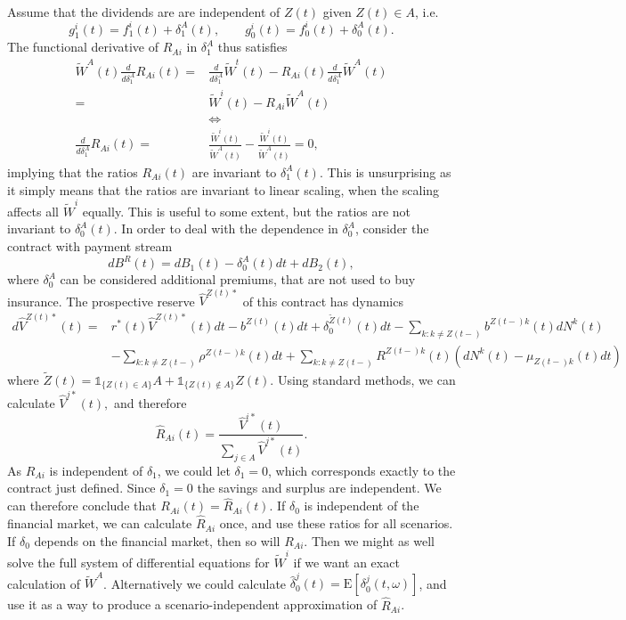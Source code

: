 \documentclass[12pt]{article}
\newcommand{\E}{\text{E}}
\newcommand{\indic}[1]{\mathds{1}_{ \{ #1 \} }}
\theoremstyle{my_thm}
\begin{document}
\\[12pt]
Assume that the dividends are are independent of $Z(t)$ given $Z(t)\in A$, i.e.
$$
g_1^i(t)=f_1^i(t)+\delta_1^A(t), \qquad g_0^i(t)=f_0^i(t)+\delta_0^A(t).
$$
The functional derivative of $R_{Ai}$ in $\delta_1^A$ thus satisfies
\begin{align*}
\tilde{W}^A(t) \frac{d}{d \delta_1^A}R_{Ai}(t)=&\frac{d}{d \delta_1^A}\tilde{W}^t(t)-R_{Ai}(t) \frac{d}{d \delta_1^A}\tilde{W}^A(t)
\\
=&\tilde{W}^i(t)-R_{Ai}\tilde{W}^A(t)
\\
&\Leftrightarrow
\\
\frac{d}{d \delta_1^A}R_{Ai}(t)=&\frac{\tilde{W}^i(t)}{\tilde{W}^A(t)}-\frac{\tilde{W}^i(t)}{\tilde{W}^A(t)}=0,
\end{align*}
implying that the ratios $R_{Ai}(t)$ are invariant to $\delta_1^A(t)$. This is unsurprising as it simply means that the ratios are invariant to linear scaling, when the scaling affects all $\tilde{W}^i$ equally. This is useful to some extent, but the ratios are not invariant to $\delta_0^A(t)$. In order to deal with the dependence in $\delta_0^A$, consider the contract with payment stream
$$
dB^R(t)=dB_1(t)-\delta_0^A(t)dt + dB_2(t),
$$
where $\delta_0^A$ can be considered additional premiums, that are not used to buy insurance. The prospective reserve $\hat{V}^{Z(t)*}$ of this contract has dynamics
\begin{align*}
d\hat{V}^{Z(t)*}(t)=&r^*(t)\hat{V}^{Z(t)*}(t)dt - b^{Z(t)}(t) dt + \delta_0^{\tilde{Z}(t)}(t)dt-\sum_{k:k \neq Z(t-)} b^{Z(t-)k}(t) dN^k(t)
\\
&- \sum_{k: k\neq Z(t-)} \rho^{Z(t-)k}(t) dt + \sum_{k: k\neq Z(t-)}R^{Z(t-)k}(t)\left(dN^k(t)-\mu_{Z(t-)k}(t) dt\right)
\end{align*}
where $\tilde{Z}(t)=\indic{Z(t) \in A} A+ \indic{Z(t) \notin A} Z(t)$. Using standard methods, we can calculate
$
\hat{V}^{j*}(t),
$
and therefore
$$
\hat{R}_{Ai}(t)=\frac{\hat{V}^{i*}(t)}{\sum_{j \in A} \hat{V}^{j*}(t)}.
$$
As $R_{Ai}$ is independent of $\delta_1$, we could let $\delta_1=0$, which corresponds exactly to the contract just defined. Since $\delta_1=0$ the savings and surplus are independent. We can therefore conclude that $R_{Ai}(t)=\hat{R}_{Ai}(t)$. If $\delta_0$ is independent of the financial market, we can calculate $\hat{R}_{Ai}$ once, and use these ratios for all scenarios. If $\delta_0$ depends on the financial market, then so will $R_{Ai}$. Then we might as well solve the full system of differential equations for $\tilde{W}^i$ if we want an exact calculation of $\tilde{W}^A$. Alternatively we could calculate $\hat{\delta}^j_0(t)=\E [ \delta^j_0(t,\omega)]$, and use it as a way to produce a scenario-independent approximation of $\hat{R}_{Ai}$. \\[12pt]
\end{document}
